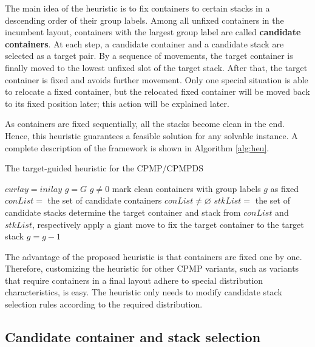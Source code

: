 \documentclass[review,3p,times,authoryear,12pt]{elsarticle}
\begin{document}
The main idea of the heuristic is to fix containers to certain stacks in a descending order of their group labels.
Among all unfixed containers in the incumbent layout, containers with the largest group label are called \textbf{candidate containers}.
At each step, a candidate container and a candidate stack are selected as a target pair.
By a sequence of movements, the target container is finally moved to the lowest unfixed slot of the target stack.
After that, the target container is fixed and avoids further movement.
Only one special situation is able to relocate a fixed container, but the relocated fixed container will be moved back to its fixed position later; this action will be explained later.

As containers are fixed sequentially, all the stacks become clean in the end.
Hence, this heuristic guarantees a feasible solution for any solvable instance.
A complete description of the framework is shown in Algorithm \ref{alg:heu}.

\begin{algorithm*}[!htb]
	\caption{The target-guided heuristic for the CPMP/CPMPDS}
	\label{alg:heu}
	\begin{codebox}
	\li $\mathit{curlay} = \mathit{inilay}$
    \li $\mathit{g} = G$
    \li \While $g\neq0$
    \li \Do
            mark clean containers with group labels $g$ as fixed\label{heu:c}
    \li     $\mathit{conList} = $ the set of candidate containers
    \li     \While $\mathit{conList} \neq \varnothing$\label{heu:l}
    \li     \Do
                $\mathit{stkList} = $ the set of candidate stacks
    \li         determine the target container and stack from $\mathit{conList}$ and $\mathit{stkList}$, respectively
    \li         apply a giant move to fix the target container to the target stack
            \End
    \li $g=g-1$
        \End
	\end{codebox}
\end{algorithm*}


The advantage of the proposed heuristic is that containers are fixed one by one.
Therefore, customizing the heuristic for other CPMP variants, such as variants that require containers in a final layout adhere to special distribution characteristics, is easy.
The heuristic only needs to modify candidate stack selection rules according to the required distribution.

\subsection{Candidate container and stack selection}
\label{sec:can}
\end{document}
